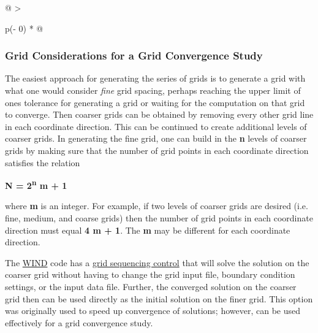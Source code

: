 \begin{longtable}[]{@{}
  >{\raggedright\arraybackslash}p{(\columnwidth - 0\tabcolsep) * }@{}}
\begin{minipage}[t]{\linewidth}
\hypertarget{grid-considerations-for-a-grid-convergence-study}{%
\subsubsection{Grid Considerations for a Grid Convergence
Study}\label{grid-considerations-for-a-grid-convergence-study}}

The easiest approach for generating the series of grids is to generate a
grid with what one would consider \emph{fine} grid spacing, perhaps
reaching the upper limit of one\textquotesingle s tolerance for
generating a grid or waiting for the computation on that grid to
converge. Then coarser grids can be obtained by removing every other
grid line in each coordinate direction. This can be continued to create
additional levels of coarser grids. In generating the fine grid, one can
build in the \textbf{n} levels of coarser grids by making sure that the
number of grid points in each coordinate direction satisfies the
relation

\textbf{N = 2\textsuperscript{n} m + 1}

where \textbf{m} is an integer. For example, if two levels of coarser
grids are desired (i.e. fine, medium, and coarse grids) then the number
of grid points in each coordinate direction must equal \textbf{4 m + 1}.
The \textbf{m} may be different for each coordinate direction.

The \href{http://www.grc.nasa.gov/WWW/winddocs}{WIND} code has a
\href{http://www.grc.nasa.gov/WWW/winddocs/user/keywords/sequence.html}{grid
sequencing control} that will solve the solution on the coarser grid
without having to change the grid input file, boundary condition
settings, or the input data file. Further, the converged solution on the
coarser grid then can be used directly as the initial solution on the
finer grid. This option was originally used to speed up convergence of
solutions; however, can be used effectively for a grid convergence
study.


\end{minipage}
\end{longtable}
